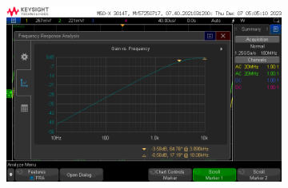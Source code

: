 \documentclass[notitlepage, 12pt]{report}
\begin{document}
\begin{enumerate}
\begin{figure}
\begin{subfigure}{0.3\textwidth}
        \end{subfigure}
        \hfill
        \begin{subfigure}{0.3\textwidth}
            \includegraphics[scale=0.2]{images/highpass.png}
        \end{subfigure}    
    

\end{figure}
\end{enumerate}
\end{document}
